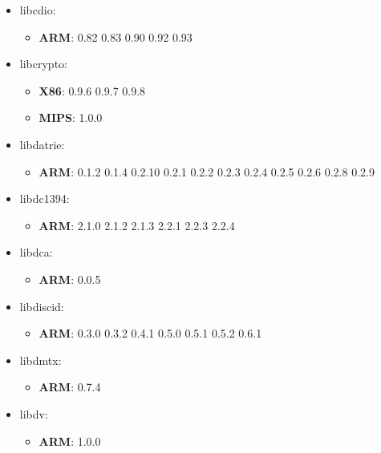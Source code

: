 \documentclass[twocolumn,a4paper]{IEEEtran} %
\begin{document}
\begin{itemize}[noitemsep,topsep=0pt,parsep=0pt,partopsep=0pt]
\item libcdio:
\begin{itemize}[noitemsep,topsep=0pt,parsep=0pt,partopsep=0pt]
  \item \textbf{ARM}: 0.82 0.83 0.90 0.92 0.93
\end{itemize}

\item libcrypto:
\begin{itemize}[noitemsep,topsep=0pt,parsep=0pt,partopsep=0pt]
  \item \textbf{X86}: 0.9.6 0.9.7 0.9.8
  \item \textbf{MIPS}: 1.0.0
\end{itemize}

\item libdatrie:
\begin{itemize}[noitemsep,topsep=0pt,parsep=0pt,partopsep=0pt]
  \item \textbf{ARM}: 0.1.2 0.1.4 0.2.10 0.2.1 0.2.2 0.2.3 0.2.4 0.2.5 0.2.6 0.2.8 0.2.9
\end{itemize}

\item libdc1394:
\begin{itemize}[noitemsep,topsep=0pt,parsep=0pt,partopsep=0pt]
  \item \textbf{ARM}: 2.1.0 2.1.2 2.1.3 2.2.1 2.2.3 2.2.4
\end{itemize}

\item libdca:
\begin{itemize}[noitemsep,topsep=0pt,parsep=0pt,partopsep=0pt]
  \item \textbf{ARM}: 0.0.5
\end{itemize}

\item libdiscid:
\begin{itemize}[noitemsep,topsep=0pt,parsep=0pt,partopsep=0pt]
  \item \textbf{ARM}: 0.3.0 0.3.2 0.4.1 0.5.0 0.5.1 0.5.2 0.6.1
\end{itemize}

\item libdmtx:
\begin{itemize}[noitemsep,topsep=0pt,parsep=0pt,partopsep=0pt]
  \item \textbf{ARM}: 0.7.4
\end{itemize}

\item libdv:
\begin{itemize}[noitemsep,topsep=0pt,parsep=0pt,partopsep=0pt]
  \item \textbf{ARM}: 1.0.0
\end{itemize}


\end{itemize}
\end{document}
